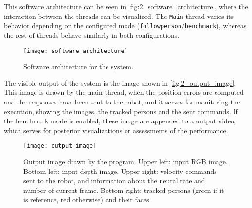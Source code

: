 This software architecture can be seen in \autoref{fig:2_software_architecture}, where the interaction between the threads can be visualized. The \texttt{Main} thread varies its behavior depending on the configured mode (\texttt{followperson}/\texttt{benchmark}), whereas the rest of threads  behave similarly in both configurations.

\begin{figure}[h]
	\centering
	\texttt{[image: software\_architecture]}
	\caption{Software architecture for the system.}
	\label{fig:2_software_architecture}
\end{figure}



The visible output of the system is the image shown in \autoref{fig:2_output_image}. This image is drawn by the main thread, when the position errors are computed and the responses have been sent to the robot, and it serves for monitoring the execution, showing the images, the tracked persons and the sent commands. If the benchmark mode is enabled, these image are appended to a output video, which serves for posterior visualizations or assessments of the performance.

\begin{figure}[h]
	\centering
	\texttt{[image: output\_image]}
	\caption{Output image drawn by the program. Upper left: input RGB image. Bottom left: input depth image. Upper right: velocity commands sent to the robot, and information about the neural rate and number of current frame. Bottom right: tracked persons (green if it is reference, red otherwise) and their faces}
	\label{fig:2_output_image}
\end{figure}




